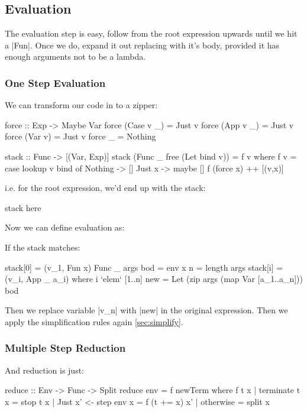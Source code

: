 \documentclass{sigplanconf}
\begin{document}
\subsection{Evaluation}
\label{sec:eval}

The evaluation step is easy, follow from the root expression upwards until we hit a |Fun|. Once we do, expand it out replacing with it's body, provided it has enough arguments not to be a lambda.

\subsubsection{One Step Evaluation}

We can transform our code in to a zipper:

\begin{code}
force :: Exp -> Maybe Var
force (Case v _) = Just v
force (App v _) = Just v
force (Var v) = Just v
force _ = Nothing

stack :: Func -> [(Var, Exp)]
stack (Func _ free (Let bind v)) = f v
    where f v = case lookup v bind of
                     Nothing -> []
                     Just x -> maybe [] f (force x) ++ [(v,x)]
\end{code}

i.e. for the root expression, we'd end up with the stack:

\begin{code}
stack here
\end{code}

Now we can define evaluation as:

If the stack matches:

\begin{code}
stack[0] = (v_1, Fun x)
Func _ args bod = env x
n = length args
stack[i] = (v_i, App _ a_i)   where i `elem` [1..n]
new = Let (zip args (map Var [a_1..a_n])) bod
\end{code}

Then we replace variable |v_n| with |new| in the original expression. Then we apply the simplification rules again \ref{sec:simplify}.

\subsubsection{Multiple Step Reduction}

And reduction is just:

\begin{code}
reduce :: Env -> Func -> Split
reduce env = f newTerm
    where f t x | terminate t x = stop t x
                | Just x' <- step env x = f (t += x) x'
                | otherwise = split x
\end{code}
\end{document}
